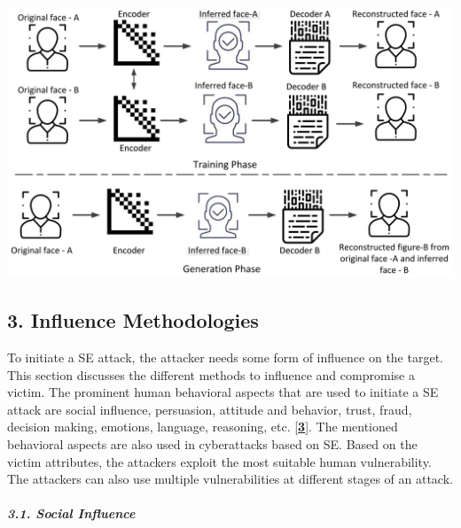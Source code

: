      \justifying
     \includegraphics[width=0.75\linewidth]{deepfake.png}
     \label{fig:placeholder}
 
\subsection{\textbf{3. Influence Methodologies}}

To initiate a SE attack, the attacker needs some form of influence on the target. This section discusses the different methods to influence and compromise a victim. The prominent human behavioral aspects that are used to initiate a SE attack are social influence, persuasion, attitude and behavior, trust, fraud, decision making, emotions, language, reasoning, etc. [\href{https://www.mdpi.com/2076-3417/12/12/6042\#B3-applsci-12-06042}{\textbf{3}}]. The mentioned behavioral aspects are also used in cyberattacks based on SE. Based on the victim attributes, the attackers exploit the most suitable human vulnerability. The attackers can also use multiple vulnerabilities at different stages of an attack.

\paragraph{\textit{3.1. Social Influence}}

